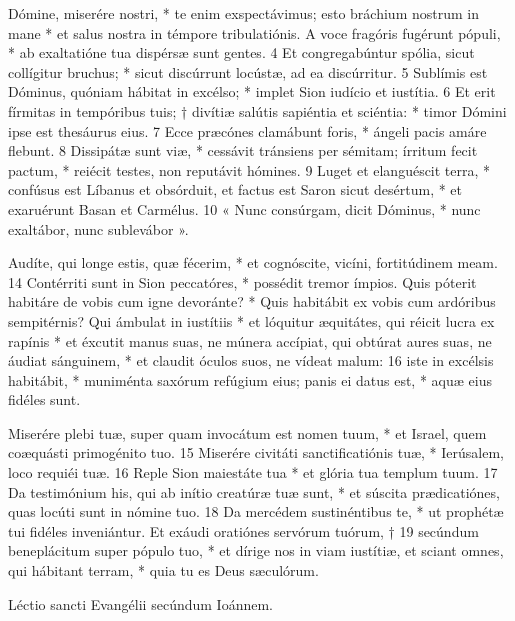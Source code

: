 

Dómine, miserére nostri, *
te enim exspectávimus;
esto bráchium nostrum in mane *
et salus nostra in témpore tribulatiónis.
A voce fragóris fugérunt pópuli, *
ab exaltatióne tua dispérsæ sunt gentes.
4 Et congregabúntur spólia, sicut collígitur bruchus; *
sicut discúrrunt locústæ, ad ea discúrritur.
5 Sublímis est Dóminus, quóniam hábitat in excélso; *
implet Sion iudício et iustítia.
6 Et erit fírmitas in tempóribus tuis; †
divítiæ salútis sapiéntia et sciéntia: *
timor Dómini ipse est thesáurus eius.
7 Ecce præcónes clamábunt foris, *
ángeli pacis amáre flebunt.
8 Dissipátæ sunt viæ, *
cessávit tránsiens per sémitam;
írritum fecit pactum, *
reiécit testes,
non reputávit hómines.
9 Luget et elanguéscit terra, *
confúsus est Líbanus et obsórduit,
et factus est Saron sicut desértum, *
et exaruérunt Basan et Carmélus.
10 « Nunc consúrgam, dicit Dóminus, *
nunc exaltábor, nunc sublevábor ».


Audíte, qui longe estis, quæ fécerim, *
et cognóscite, vicíni, fortitúdinem meam.
14 Contérriti sunt in Sion peccatóres, *
possédit tremor ímpios.
Quis póterit habitáre de vobis cum igne devoránte? *
Quis habitábit ex vobis cum ardóribus sempitérnis?
Qui ámbulat in iustítiis *
et lóquitur æquitátes,
qui réicit lucra ex rapínis *
et éxcutit manus suas, ne múnera accípiat,
qui obtúrat aures suas, ne áudiat sánguinem, *
et claudit óculos suos, ne vídeat malum:
16 iste in excélsis habitábit, *
muniménta saxórum refúgium eius;
panis ei datus est, *
aquæ eius fidéles sunt.


Miserére plebi tuæ,
super quam invocátum est nomen tuum, *
et Israel, quem coæquásti primogénito tuo.
15 Miserére civitáti sanctificatiónis tuæ, *
Ierúsalem, loco requiéi tuæ.
16 Reple Sion maiestáte tua *
et glória tua templum tuum.
17 Da testimónium his,
qui ab inítio creatúræ tuæ sunt, *
et súscita prædicatiónes,
quas locúti sunt in nómine tuo.
18 Da mercédem sustinéntibus te, *
ut prophétæ tui fidéles inveniántur.
Et exáudi oratiónes servórum tuórum, †
19 secúndum beneplácitum super pópulo tuo, *
et dírige nos in viam iustítiæ,
et sciant omnes, qui hábitant terram, *
quia tu es Deus sæculórum.

Léctio sancti Evangélii secúndum Ioánnem.

